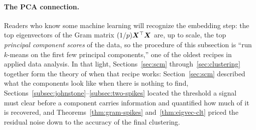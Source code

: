 \paragraph{The PCA connection.}
Readers who know some machine learning will recognize the embedding step: the top eigenvectors of the Gram matrix \((1/p)\bm{X}^{\top}\bm{X}\) are, up to scale, the top \emph{principal component scores} of the data, so the procedure of this subsection is ``run \(k\)-means on the first few principal components,'' one of the oldest recipes in applied data analysis. In that light, Sections~\ref{sec:scm} through~\ref{sec:clustering} together form the theory of when that recipe works: Section~\ref{sec:scm} described what the components look like when there is nothing to find, Sections~\ref{subsec:johnstone}--\ref{subsec:two-spikes} located the threshold a signal must clear before a component carries information and quantified how much of it is recovered, and Theorems~\ref{thm:gram-spikes} and~\ref{thm:eigvec-clt} priced the residual noise down to the accuracy of the final clustering.

\clearpage
